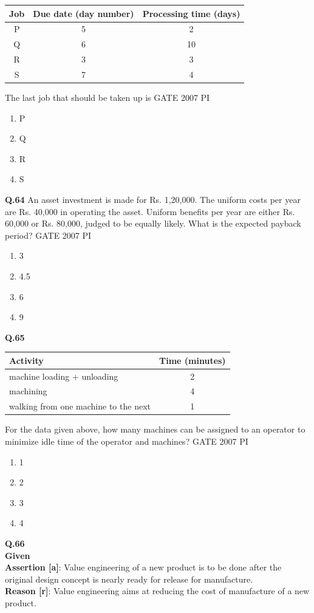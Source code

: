 \documentclass[journal,12pt,onecolumn]{exam}
\theoremstyle{remark}
\begin{document}
\begin{center}
\begin{tabular}{|c|c|c|}
\hline
\textbf{Job} & \textbf{Due date (day number)} & \textbf{Processing time (days)} \\
\hline
P & 5 & 2 \\
Q & 6 & 10 \\
R & 3 & 3 \\
S & 7 & 4 \\
\hline
\end{tabular}
\end{center}

The last job that should be taken up is
\hfill{GATE 2007 PI}
\begin{enumerate}
    \item P
    \item Q
    \item R
    \item S
\end{enumerate}
\noindent
\textbf{Q.64}
An asset investment is made for Rs. 1,20,000. The uniform costs per year are Rs. 40,000 in operating the asset. Uniform benefits per year are either Rs. 60,000 or Rs. 80,000, judged to be equally likely. What is the expected payback period?
\hfill{GATE 2007 PI}
\begin{enumerate}
    \item 3
    \item 4.5
    \item 6
    \item 9
\end{enumerate}
\noindent
\textbf{Q.65}
\begin{center}
\begin{tabular}{|l|c|}
\hline
\textbf{Activity} & \textbf{Time (minutes)} \\
\hline
machine loading + unloading & 2 \\
machining & 4 \\
walking from one machine to the next & 1 \\
\hline
\end{tabular}
\end{center}

For the data given above, how many machines can be assigned to an operator to minimize 
idle time of the operator and machines?
\hfill{GATE 2007 PI}
\begin{enumerate}
    \item 1
    \item 2
    \item 3
    \item 4
    \end{enumerate}
    \noindent
    \textbf{Q.66} \\
    \textbf{Given} \\[2pt]
\textbf{Assertion [a]}: Value engineering of a new product is to be done after the original 
design concept is nearly ready for release for manufacture. \\[4pt]
\textbf{Reason [r]}: Value engineering aims at reducing the cost of manufacture of a new product.
\end{document}

